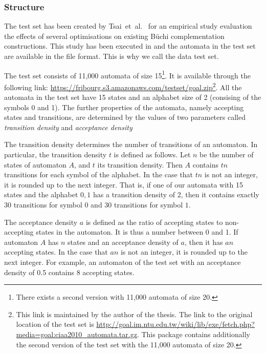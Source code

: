 \subsubsection{Structure}
The \goal{} test set has been created by Tsai~et~al.~\cite{2011_tsai} for an empirical study evaluation the effects of several optimisations on existing Büchi complementation constructions. This study has been executed in \goal{} and the automata in the test set are available in the \goal{} file format. This is why we call the data \goal{} test set.

The \goal{} test set consists of 11,000 automata of size 15\footnote{There exists a second version with 11,000 automata of size 20.}. It is available through the following link: \url{https://fribourg.s3.amazonaws.com/testset/goal.zip}\footnote{This link is maintained by the author of the thesis. The link to the original location of the  \goal{} test set is \url{http://goal.im.ntu.edu.tw/wiki/lib/exe/fetch.php?media=goal:ciaa2010_automata.tar.gz}. This package contains additionally the second version of the \goal{} test set with the 11,000 automata of size 20.}. All the automata in the test set have 15 states and an alphabet size of 2 (consising of the symbols 0 and 1). The further properties of the automata, namely accepting states and transitions, are determined by the values of two parameters called \textit{transition density} and \textit{acceptance density}

The transition density determines the number of transitions of an automaton. In particular, the transition density $t$ is defined as follows. Let $n$ be the number of states of automaton $A$, and $t$ its transition density. Then $A$ contains $tn$ transitions for each symbol of the alphabet. In the case that $tn$ is not an integer, it is rounded up to the next integer. That is, if one of our automata with 15 states and the alphabet ${0, 1}$ has a transition density of 2, then it contains exactly 30 transitions for symbol $0$ and 30 transitions for symbol $1$. %

The acceptance density $a$ is defined as the ratio of accepting states to non-accepting states in the automaton. It is thus a number between 0 and 1. If automaton $A$ has $n$ states and an acceptance density of $a$, then it has $an$ accepting states. In the case that $an$ is not an integer, it is rounded up to the next integer. For example, an automaton of the test set with an acceptance density of 0.5 contains 8 accepting states. %

